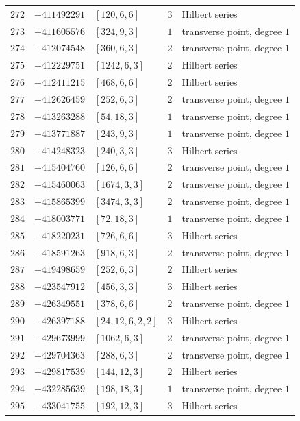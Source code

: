 \documentclass[11pt]{article}
\begin{document}
\begin{center}
\begin{longtable}{r r l c l}
$272$ & $-411492291$ & $[120,6,6]$ & $3$ & Hilbert series\\
$273$ & $-411605576$ & $[324,9,3]$ & $1$ & transverse point, degree $1$\\
$274$ & $-412074548$ & $[360,6,3]$ & $2$ & transverse point, degree $1$\\
$275$ & $-412229751$ & $[1242,6,3]$ & $2$ & Hilbert series\\
$276$ & $-412411215$ & $[468,6,6]$ & $2$ & Hilbert series\\
$277$ & $-412626459$ & $[252,6,3]$ & $2$ & transverse point, degree $1$\\
$278$ & $-413263288$ & $[54,18,3]$ & $1$ & transverse point, degree $1$\\
$279$ & $-413771887$ & $[243,9,3]$ & $1$ & transverse point, degree $1$\\
$280$ & $-414248323$ & $[240,3,3]$ & $3$ & Hilbert series\\
$281$ & $-415404760$ & $[126,6,6]$ & $2$ & transverse point, degree $1$\\
$282$ & $-415460063$ & $[1674,3,3]$ & $2$ & transverse point, degree $1$\\
$283$ & $-415865399$ & $[3474,3,3]$ & $2$ & transverse point, degree $1$\\
$284$ & $-418003771$ & $[72,18,3]$ & $1$ & transverse point, degree $1$\\
$285$ & $-418220231$ & $[726,6,6]$ & $3$ & Hilbert series\\
$286$ & $-418591263$ & $[918,6,3]$ & $2$ & transverse point, degree $1$\\
$287$ & $-419498659$ & $[252,6,3]$ & $2$ & Hilbert series\\
$288$ & $-423547912$ & $[456,3,3]$ & $3$ & Hilbert series\\
$289$ & $-426349551$ & $[378,6,6]$ & $2$ & transverse point, degree $1$\\
$290$ & $-426397188$ & $[24,12,6,2,2]$ & $3$ & Hilbert series\\
$291$ & $-429673999$ & $[1062,6,3]$ & $2$ & transverse point, degree $1$\\
$292$ & $-429704363$ & $[288,6,3]$ & $2$ & transverse point, degree $1$\\
$293$ & $-429817539$ & $[144,12,3]$ & $2$ & Hilbert series\\
$294$ & $-432285639$ & $[198,18,3]$ & $1$ & transverse point, degree $1$\\
$295$ & $-433041755$ & $[192,12,3]$ & $3$ & Hilbert series\\

\end{longtable}
\end{center}
\end{document}
